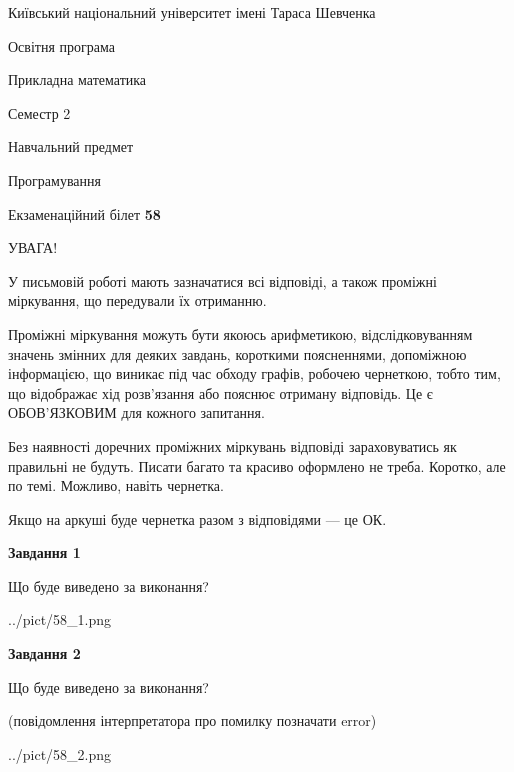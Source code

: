 \documentclass[12pt, ukrainian]{article}
\begin{document}
{{\begin {small}\par
{ \center  Київський національний університет імені Тараса Шевченка \par}
{\parbox {5 cm}{Освітня програма \hfill}{\parbox {7 cm}{Прикладна математика\hfill}}\parbox {6 cm}{\hfill Семестр 2}}\par
{\parbox {5 cm} {Навчальний предмет \hfill}\parbox {7 cm}{Програмування \hfill}\parbox {6cm}{\hfill}\par}\vspace{-7pt} \end{small}}{\center Екзаменаційний білет \No \textbf
{ 58 }\par}}
{
\begin {large}
УВАГА!

У письмовій роботі мають зазначатися всі відповіді, а також проміжні міркування, що передували їх отриманню.

Проміжні міркування можуть бути якоюсь арифметикою, відслідковуванням зна\-чень змінних для деяких завдань,
короткими поясненнями, допоміжною інформацією, що виникає під час обходу графів, робочею чернеткою,
тобто тим, що відображає хід розв’язання або пояснює отриману відповідь.
Це є ОБОВ’ЯЗКОВИМ для кожного запитання.

Без наявності доречних проміжних міркувань відповіді зараховуватись як правиль\-ні не будуть.
Писати багато та красиво оформлено не треба. Коротко, але по темі. Можли\-во, навіть чернетка.

Якщо на аркуші буде чернетка разом з відповідями --- це ОК.

\newpage

{\begin {center}\textbf{Завдання 1}\end {center}}\par
Що буде виведено за виконання?\par
\begin{center}
	{../pict/58_1.png}
\end{center}
\newpage

{\begin {center}\textbf{Завдання 2}\end {center}}\par
Що буде виведено за виконання?\par
 (повідомлення інтерпретатора про помилку позначати error)\par
\begin{center}
	{../pict/58_2.png}
\end{center}
\newpage


\end{large}}
\end{document}
